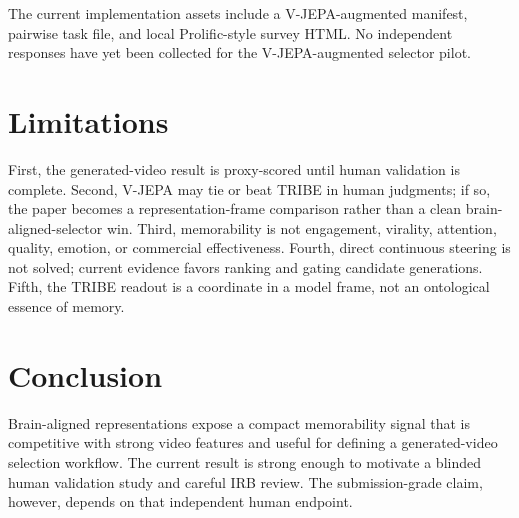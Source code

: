\documentclass[11pt]{article}
\begin{document}
The current implementation assets include a V-JEPA-augmented manifest, pairwise
task file, and local Prolific-style survey HTML. No independent responses have
yet been collected for the V-JEPA-augmented selector pilot.

\section{Limitations}

First, the generated-video result is proxy-scored until human validation is
complete. Second, V-JEPA may tie or beat TRIBE in human judgments; if so, the
paper becomes a representation-frame comparison rather than a clean
brain-aligned-selector win. Third, memorability is not engagement, virality,
attention, quality, emotion, or commercial effectiveness. Fourth, direct
continuous steering is not solved; current evidence favors ranking and gating
candidate generations. Fifth, the TRIBE readout is a coordinate in a model frame,
not an ontological essence of memory.

\section{Conclusion}

Brain-aligned representations expose a compact memorability signal that is
competitive with strong video features and useful for defining a generated-video
selection workflow. The current result is strong enough to motivate a blinded
human validation study and careful IRB review. The submission-grade claim,
however, depends on that independent human endpoint.

\clearpage
\appendix




\end{document}
